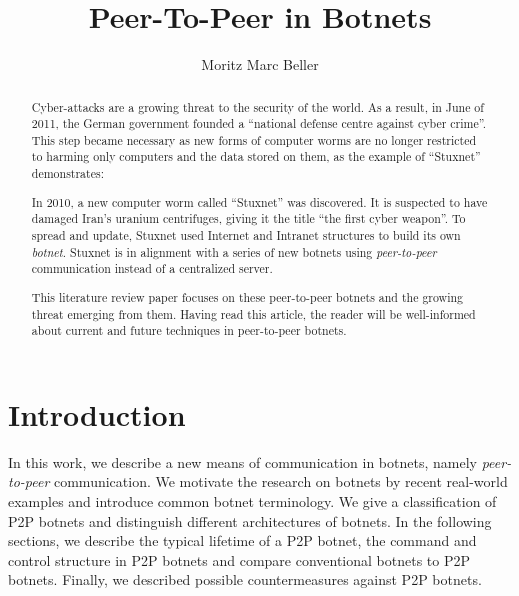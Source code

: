\documentclass{llncs}
\title{Peer-To-Peer in Botnets}
\author{Moritz Marc Beller}
\institute{%
   Fakultät für Informatik, \\
   Technische Universität München \\
   \email{\{beller\}@in.tum.de}
}
\begin{document}
\maketitle

\begin{abstract}
Cyber-attacks are a growing threat to the security of the world. As a
result, in June of 2011, the German government founded a ``national
defense centre against cyber crime''.\cite{cyber} This step became
necessary as new forms of computer worms are no longer restricted to
harming only computers and the data stored on them, as the example of
``Stuxnet'' demonstrates:

 In 2010, a new computer worm called ``Stuxnet'' was discovered. It is
 suspected to have damaged Iran's uranium centrifuges, giving it the
 title ``the first cyber weapon''\cite{benzin2011first}. To spread and
 update, Stuxnet used Internet and Intranet structures to build its
 own {\it botnet}.\cite{fallierew32} Stuxnet is in alignment with a series
 of new botnets using {\it peer-to-peer} communication instead of a
 centralized server. 

This literature review paper focuses on these peer-to-peer botnets and
the growing threat emerging from them. Having read this article, the
reader will be well-informed about current and future techniques in
peer-to-peer botnets.
\end{abstract}

\section{Introduction}

In this work, we describe a new means of communication in botnets,
namely {\it peer-to-peer} communication.  We motivate the research on
botnets by recent real-world examples and introduce common botnet
terminology. We give a classification of P2P botnets and distinguish
different architectures of botnets. In the following sections, we
describe the typical lifetime of a P2P botnet, the command and control
structure in P2P botnets and compare conventional botnets to P2P
botnets. Finally, we described possible countermeasures against P2P
botnets.
\end{document}
